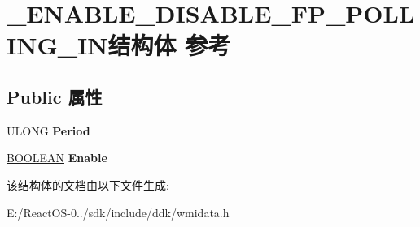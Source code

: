 \hypertarget{struct___e_n_a_b_l_e___d_i_s_a_b_l_e___f_p___p_o_l_l_i_n_g___i_n}{}\section{\+\_\+\+E\+N\+A\+B\+L\+E\+\_\+\+D\+I\+S\+A\+B\+L\+E\+\_\+\+F\+P\+\_\+\+P\+O\+L\+L\+I\+N\+G\+\_\+\+I\+N结构体 参考}
\label{struct___e_n_a_b_l_e___d_i_s_a_b_l_e___f_p___p_o_l_l_i_n_g___i_n}
\subsection*{Public 属性}
\begin{DoxyCompactItemize}
\item 
\mbox{\label{struct___e_n_a_b_l_e___d_i_s_a_b_l_e___f_p___p_o_l_l_i_n_g___i_n_a95c413f2a60cdbb567f156f03eea44b0}} 
U\+L\+O\+NG {\bfseries Period}
\item 
\mbox{\label{struct___e_n_a_b_l_e___d_i_s_a_b_l_e___f_p___p_o_l_l_i_n_g___i_n_af109d93d40c660f9340713e5b2394250}} 
\hyperlink{_processor_bind_8h_a112e3146cb38b6ee95e64d85842e380a}{B\+O\+O\+L\+E\+AN} {\bfseries Enable}
\end{DoxyCompactItemize}


该结构体的文档由以下文件生成\+:\begin{DoxyCompactItemize}
\item 
E\+:/\+React\+O\+S-\/0../sdk/include/ddk/wmidata.\+h\end{DoxyCompactItemize}
